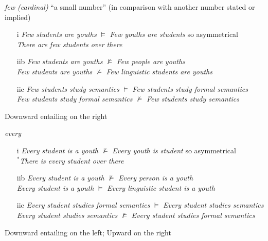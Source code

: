 \documentclass[a4paper]{article}
\begin{document}
\begin{enumerate}
\begin{exe}
    \ex \textit{few (cardinal)} ``a small number'' (in comparison with another number stated or implied) 
      \begin{itemize}
    \item[i] \textit{Few students are youths} $\models$
      \textit{Few youths are students} so asymmetrical
      \\ \textit{There are few students over there}
    \item[iib] \textit{Few students are youths}  $\not\models$
      \textit{Few people are youths}
     \\  \textit{Few students are youths}  $\not\models$
     \textit{Few linguistic students are youths}
       \item[iic] \textit{Few students study semantics}  $\models$
      \textit{Few students study formal semantics}
     \\  \textit{Few students study formal semantics}  $\not\models$
      \textit{Few students study semantics} 
    \end{itemize}
     Downward entailing on the right
    
    \ex \textit{every}
    \begin{itemize}
    \item[i] \textit{Every student is a youth} $\not\models$
      \textit{Every youth is student} so asymmetrical
      \\ $^*$\textit{There is every student over there}
    \item[iib] \textit{Every student is a youth}  $\not\models$
      \textit{Every person is a youth}
     \\  \textit{Every student is a youth}  $\models$
     \textit{Every linguistic student is a youth}
       \item[iic] \textit{Every student studies formal semantics}  $\models$
      \textit{Every student studies semantics} 
     \\  \textit{Every student studies semantics}  $\not\models$
      \textit{Every student studies formal semantics}
    \end{itemize}
      Downward entailing on the left; Upward on the right


\end{exe}
\end{enumerate}
\end{document}
